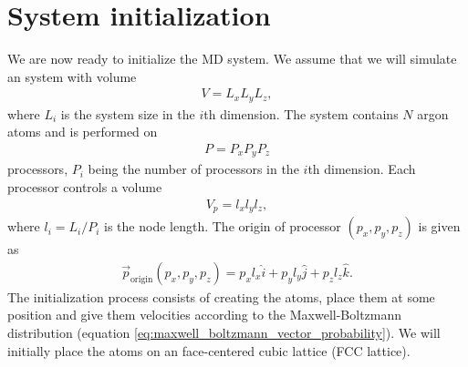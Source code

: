 \section{System initialization}
We are now ready to initialize the MD system. We assume that we will simulate an system with volume 
\begin{align}
	V=L_xL_yL_z,
\end{align}
where $L_i$ is the system size in the $i$th dimension. The system contains $N$ argon atoms and is performed on
\begin{align}
	P = P_xP_yP_z 
\end{align}
processors, $P_i$ being the number of processors in the $i$th dimension. Each processor controls a volume 
\begin{align}
	V_p = l_xl_yl_z,
\end{align}
where $l_i = L_i/P_i$ is the node length. The origin of processor $(p_x, p_y, p_z)$ is given as
\begin{align}
 	\vec p_\text{origin}(p_x, p_y, p_z) = p_xl_x\hat i + p_yl_y\hat j + p_zl_z \hat k.
\end{align}
The initialization process consists of creating the atoms, place them at some position and give them velocities according to the Maxwell-Boltzmann distribution (equation \eqref{eq:maxwell_boltzmann_vector_probability}). We will initially place the atoms on an face-centered cubic lattice (FCC lattice).

